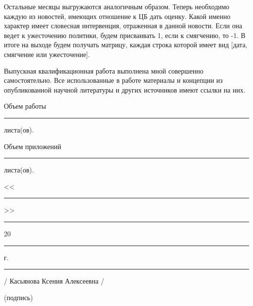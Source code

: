 \documentclass[12pt,a4paper, oneside]{extreport}
\begin{document}
%
%

Остальные месяцы выгружаются аналогичным образом. Теперь необходимо каждую из новостей, имеющих отношение к ЦБ дать оценку. Какой именно характер имеет словесная интервенция, отраженная в данной новости. Если она ведет к ужесточению политики, будем присваивать 1, если к смягчению, то -1. В итоге на выходе будем получать матрицу, каждая строка которой имеет вид [дата, смягчение или ужесточение].



\newpage
\thispagestyle{empty}

Выпускная квалификационная работа выполнена мной совершенно самостоятельно. Все использованные в работе материалы и концепции из опубликованной научной литературы и других источников имеют ссылки на них.

\vspace{2ex}

 Объем работы  \rule{2em}{0.5pt} листа(ов).

\vspace{2ex}

 Объем приложений \rule{2em}{0.5pt} листа(ов).

\vspace{4ex}

\noindent << \rule{1em}{0.5pt} >> \rule{5em}{0.5pt} 20 \rule{1.4em}{0.5pt} г. 

\vspace{4ex}



\noindent \rule{11em}{0.5pt} 
\hspace{8em} / Касьянова Ксения Алексеевна /

\hspace{5ex} \footnotesize (подпись)


\end{document}
